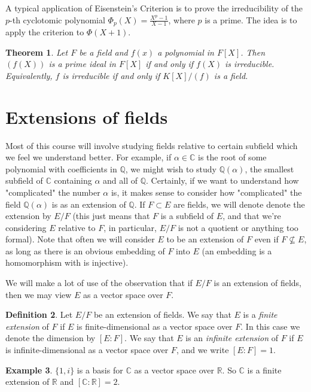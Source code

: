\documentclass[12pt]{report}
\newtheorem{thm}{Theorem}[section]
\theoremstyle{definition}
\newtheorem{defn}[thm]{Definition}
\newtheorem{example}[thm]{Example}
\def\CC{\mathbb{C}}
\def\QQ{\mathbb{Q}}
\def\RR{\mathbb{R}}
\begin{document}
A typical application of Eisenstein's Criterion is to prove the irreducibility of the $p$-th cyclotomic polynomial $\Phi_p(X) = \frac{X^p-1}{X-1}$, where $p$ is a prime. The idea is to apply the criterion to $\Phi(X+1)$.

\begin{thm}
    Let $F$ be a field and $f(x)$ a polynomial in $F[X]$. Then $(f(X))$ is a prime ideal in $F[X]$ if and only if $f(X)$ is irreducible. Equivalently, $f$ is irreducible if and only if $K[X]/(f)$ is a field.
\end{thm}

\section{Extensions of fields}

Most of this course will involve studying fields relative to certain subfield which we feel we understand better. For example, if $\alpha\in\CC$ is the root of some polynomial with coefficients in $\QQ$, we might wish to study $\QQ(\alpha)$, the smallest subfield of $\CC$ containing $\alpha$ and all of $\QQ$. Certainly, if we want to understand how "complicated" the number $\alpha$ is, it makes sense to consider how "complicated" the field $\QQ(\alpha)$ is as an extension of $\QQ$. If $F \subset E$ are fields, we will denote denote the extension by $E/F$ (this just means that $F$ is a subfield of $E$, and that we're considering $E$ relative to $F$, in particular, $E/F$ is not a quotient or anything too formal). Note that often we will consider $E$ to be an extension of $F$ even if $F\nsubseteq E$, as long as there is an obvious embedding of $F$ into $E$ (an embedding is a homomorphism with is injective). 

We will make a lot of use of the observation that if $E/F$ is an extension
of fields, then we may view $E$ as a vector space over $F$.

\begin{defn}
    Let $E/F$ be an extension of fields. We say that $E$ is a \emph{finite extension} of $F$ if $E$ is finite-dimensional as a vector space over $F$. In this case we denote the dimension by $[E:F]$. We say that $E$ is an \emph{infinite extension} of $F$ if $E$ is infinite-dimensional as a vector space over $F$, and we write $[E:F] = 1$.
\end{defn}

\begin{example}
    $\{1,i\}$ is a basis for $\CC$ as a vector space over $\RR$. So $\CC$ is a finite extension of $\RR$ and $[\CC:\RR]=2$. 
\end{example}
\end{document}
